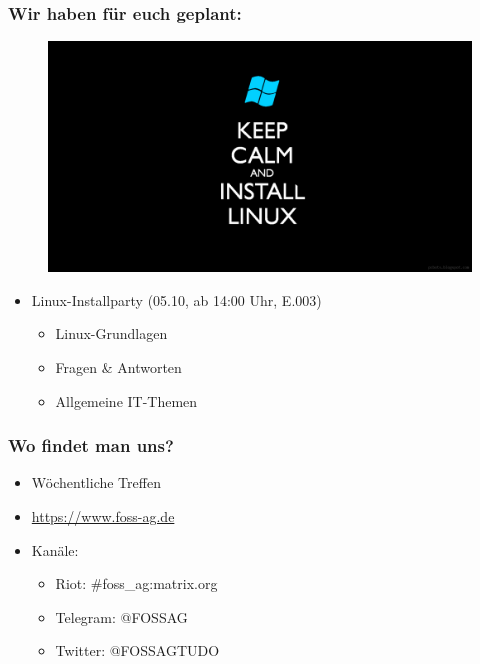 \begin{frame}
	\frametitle{Wir haben für euch geplant:}
	\begin{figure}
		\includegraphics[scale=0.145]{resources/linuxcalm.png}
	\end{figure}
	\begin{itemize}
		\item Linux-Installparty (05.10, ab 14:00 Uhr, E.003)
		\begin{itemize}
			\item Linux-Grundlagen
			\item Fragen \& Antworten
			\item Allgemeine IT-Themen
		\end{itemize}
	\end{itemize}
\end{frame}

\begin{frame}
	\frametitle{Wo findet man uns?}
	\begin{itemize}
		\item Wöchentliche Treffen
		\item \url{https://www.foss-ag.de}
		\item Kanäle:
		\begin{itemize}
			\item Riot: \#foss\_ag:matrix.org
			\item Telegram: @FOSSAG
			\item Twitter: @FOSSAGTUDO
		\end{itemize}
	\end{itemize}
\end{frame}
